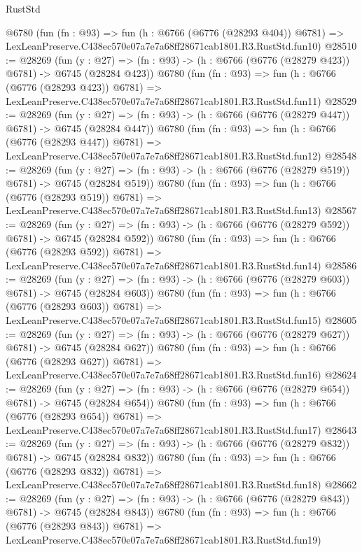 \begin{lexlean}{RustStd}
\begin{coremodule}
    @6780
    (fun (fn : @93) =>
    fun (h : @6766 (@6776 (@28293 @404)) @6781) =>
    LexLeanPreserve.C438ec570e07a7e7a68ff28671cab1801.R3.RustStd.fun10)
@28510 := @28269
    (fun (y : @27) => (fn : @93) -> (h : @6766 (@6776 (@28279 @423)) @6781) -> @6745 (@28284 @423))
    @6780
    (fun (fn : @93) =>
    fun (h : @6766 (@6776 (@28293 @423)) @6781) =>
    LexLeanPreserve.C438ec570e07a7e7a68ff28671cab1801.R3.RustStd.fun11)
@28529 := @28269
    (fun (y : @27) => (fn : @93) -> (h : @6766 (@6776 (@28279 @447)) @6781) -> @6745 (@28284 @447))
    @6780
    (fun (fn : @93) =>
    fun (h : @6766 (@6776 (@28293 @447)) @6781) =>
    LexLeanPreserve.C438ec570e07a7e7a68ff28671cab1801.R3.RustStd.fun12)
@28548 := @28269
    (fun (y : @27) => (fn : @93) -> (h : @6766 (@6776 (@28279 @519)) @6781) -> @6745 (@28284 @519))
    @6780
    (fun (fn : @93) =>
    fun (h : @6766 (@6776 (@28293 @519)) @6781) =>
    LexLeanPreserve.C438ec570e07a7e7a68ff28671cab1801.R3.RustStd.fun13)
@28567 := @28269
    (fun (y : @27) => (fn : @93) -> (h : @6766 (@6776 (@28279 @592)) @6781) -> @6745 (@28284 @592))
    @6780
    (fun (fn : @93) =>
    fun (h : @6766 (@6776 (@28293 @592)) @6781) =>
    LexLeanPreserve.C438ec570e07a7e7a68ff28671cab1801.R3.RustStd.fun14)
@28586 := @28269
    (fun (y : @27) => (fn : @93) -> (h : @6766 (@6776 (@28279 @603)) @6781) -> @6745 (@28284 @603))
    @6780
    (fun (fn : @93) =>
    fun (h : @6766 (@6776 (@28293 @603)) @6781) =>
    LexLeanPreserve.C438ec570e07a7e7a68ff28671cab1801.R3.RustStd.fun15)
@28605 := @28269
    (fun (y : @27) => (fn : @93) -> (h : @6766 (@6776 (@28279 @627)) @6781) -> @6745 (@28284 @627))
    @6780
    (fun (fn : @93) =>
    fun (h : @6766 (@6776 (@28293 @627)) @6781) =>
    LexLeanPreserve.C438ec570e07a7e7a68ff28671cab1801.R3.RustStd.fun16)
@28624 := @28269
    (fun (y : @27) => (fn : @93) -> (h : @6766 (@6776 (@28279 @654)) @6781) -> @6745 (@28284 @654))
    @6780
    (fun (fn : @93) =>
    fun (h : @6766 (@6776 (@28293 @654)) @6781) =>
    LexLeanPreserve.C438ec570e07a7e7a68ff28671cab1801.R3.RustStd.fun17)
@28643 := @28269
    (fun (y : @27) => (fn : @93) -> (h : @6766 (@6776 (@28279 @832)) @6781) -> @6745 (@28284 @832))
    @6780
    (fun (fn : @93) =>
    fun (h : @6766 (@6776 (@28293 @832)) @6781) =>
    LexLeanPreserve.C438ec570e07a7e7a68ff28671cab1801.R3.RustStd.fun18)
@28662 := @28269
    (fun (y : @27) => (fn : @93) -> (h : @6766 (@6776 (@28279 @843)) @6781) -> @6745 (@28284 @843))
    @6780
    (fun (fn : @93) =>
    fun (h : @6766 (@6776 (@28293 @843)) @6781) =>
    LexLeanPreserve.C438ec570e07a7e7a68ff28671cab1801.R3.RustStd.fun19)

\end{coremodule}
\end{lexlean}

